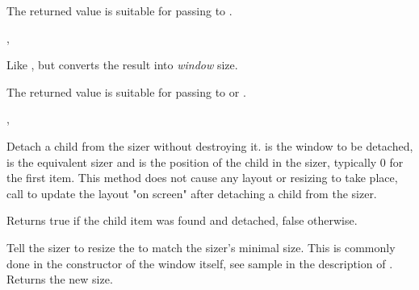 The returned value is suitable for passing to
.



,


\label{wxsizercomputefittingwindowsize}


Like ,
but converts the result into \emph{window} size.

The returned value is suitable for passing to
 or
.



,


\label{wxsizerdetach}




Detach a child from the sizer without destroying it.  is the window to be
detached,  is the equivalent sizer and  is the position of
the child in the sizer, typically 0 for the first item. This method does not
cause any layout or resizing to take place, call 
to update the layout "on screen" after detaching a child from the sizer.

Returns true if the child item was found and detached, false otherwise.




\label{wxsizerfit}


Tell the sizer to resize the  to match the sizer's minimal size. This
is commonly done in the constructor of the window itself, see sample in the description
of . Returns the new size.

